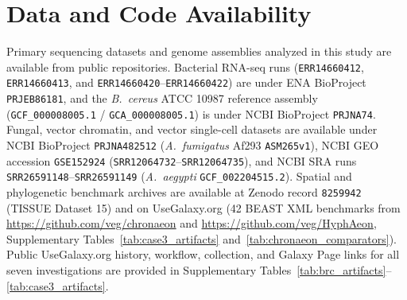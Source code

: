 \documentclass[11pt,letterpaper]{article}
\newcommand{\tool}[1]{\textsf{#1}}
\begin{document}
\section*{Data and Code Availability}
Primary sequencing datasets and genome assemblies analyzed in this study are available from public repositories. Bacterial RNA-seq runs (\texttt{ERR14660412}, \texttt{ERR14660413}, and \texttt{ERR14660420}--\texttt{ERR14660422}) are under ENA BioProject \texttt{PRJEB86181}, and the \textit{B.\ cereus} ATCC 10987 reference assembly (\texttt{GCF\_000008005.1} / \texttt{GCA\_000008005.1}) is under NCBI BioProject \texttt{PRJNA74}. Fungal, vector chromatin, and vector single-cell datasets are available under NCBI BioProject \texttt{PRJNA482512} (\textit{A.\ fumigatus} Af293 \texttt{ASM265v1}), NCBI GEO accession \texttt{GSE152924} (\texttt{SRR12064732}--\texttt{SRR12064735}), and NCBI SRA runs \texttt{SRR26591148}--\texttt{SRR26591149} (\textit{A.\ aegypti} \texttt{GCF\_002204515.2}). Spatial and phylogenetic benchmark archives are available at Zenodo record \texttt{8259942} (\tool{TISSUE} Dataset 15) and on UseGalaxy.org (42 \tool{BEAST} XML benchmarks from \url{https://github.com/veg/chronaeon} and \url{https://github.com/veg/HyphAeon}, Supplementary Tables~\ref{tab:case3_artifacts} and~\ref{tab:chronaeon_comparators}). Public UseGalaxy.org history, workflow, collection, and Galaxy Page links for all seven investigations are provided in Supplementary Tables~\ref{tab:brc_artifacts}--\ref{tab:case3_artifacts}.
\end{document}
